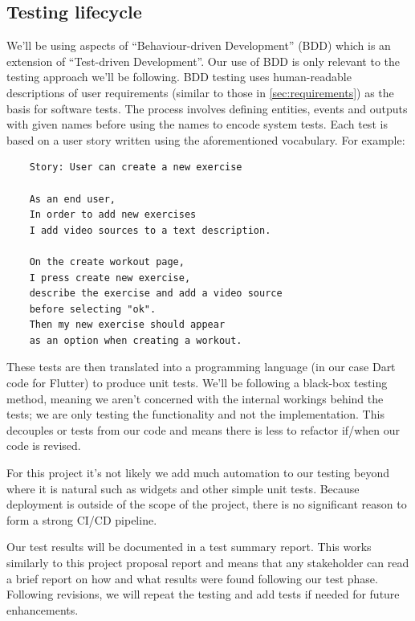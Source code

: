 \subsection{Testing lifecycle}
We'll be using aspects of ``Behaviour-driven Development'' (BDD) which is an extension of
``Test-driven Development''. Our use of BDD is only relevant to the testing approach we'll be following.
BDD testing uses human-readable descriptions of user requirements (similar to those in \cref{sec:requirements}) as the
basis for software tests. The process involves defining entities, events and outputs with given names before using
the names to encode system tests. Each test is based on a user story written using the aforementioned vocabulary.
For example:
\vspace{-5mm}
\begin{verbatim}
    Story: User can create a new exercise

    As an end user,
    In order to add new exercises
    I add video sources to a text description.

    On the create workout page,
    I press create new exercise,
    describe the exercise and add a video source
    before selecting "ok".
    Then my new exercise should appear
    as an option when creating a workout.
\end{verbatim}
\vspace{-5mm}
These tests are then translated into a programming language (in our case Dart code for Flutter)
to produce unit tests. We'll be following a black-box testing method, meaning
we aren't concerned with the internal workings behind the tests; we are only 
testing the functionality and not the implementation. This decouples
or tests from our code and means there is less to refactor if/when our code
is revised.
\par
For this project it's not likely we add much automation to our testing beyond where it is natural
such as widgets and other simple unit tests. Because deployment is outside of the scope of the project,
there is no significant reason to form a strong CI/CD pipeline.
\par
Our test results will be documented in a test summary report. This works similarly to this 
project proposal report and means that any stakeholder can read a brief report on how and what results were
found following our test phase. Following revisions, we will repeat the testing and add tests
if needed for future enhancements.

